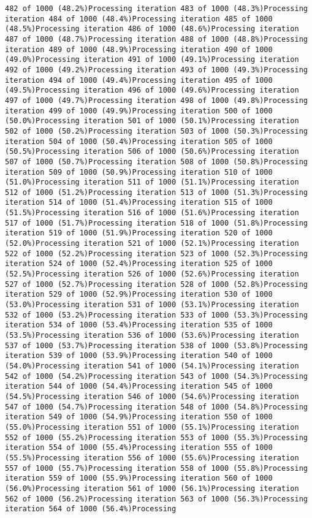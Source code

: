 \documentclass[
]{article}
\begin{document}
\begin{verbatim}
482 of 1000 (48.2%)Processing iteration 483 of 1000 (48.3%)Processing iteration 484 of 1000 (48.4%)Processing iteration 485 of 1000 (48.5%)Processing iteration 486 of 1000 (48.6%)Processing iteration 487 of 1000 (48.7%)Processing iteration 488 of 1000 (48.8%)Processing iteration 489 of 1000 (48.9%)Processing iteration 490 of 1000 (49.0%)Processing iteration 491 of 1000 (49.1%)Processing iteration 492 of 1000 (49.2%)Processing iteration 493 of 1000 (49.3%)Processing iteration 494 of 1000 (49.4%)Processing iteration 495 of 1000 (49.5%)Processing iteration 496 of 1000 (49.6%)Processing iteration 497 of 1000 (49.7%)Processing iteration 498 of 1000 (49.8%)Processing iteration 499 of 1000 (49.9%)Processing iteration 500 of 1000 (50.0%)Processing iteration 501 of 1000 (50.1%)Processing iteration 502 of 1000 (50.2%)Processing iteration 503 of 1000 (50.3%)Processing iteration 504 of 1000 (50.4%)Processing iteration 505 of 1000 (50.5%)Processing iteration 506 of 1000 (50.6%)Processing iteration 507 of 1000 (50.7%)Processing iteration 508 of 1000 (50.8%)Processing iteration 509 of 1000 (50.9%)Processing iteration 510 of 1000 (51.0%)Processing iteration 511 of 1000 (51.1%)Processing iteration 512 of 1000 (51.2%)Processing iteration 513 of 1000 (51.3%)Processing iteration 514 of 1000 (51.4%)Processing iteration 515 of 1000 (51.5%)Processing iteration 516 of 1000 (51.6%)Processing iteration 517 of 1000 (51.7%)Processing iteration 518 of 1000 (51.8%)Processing iteration 519 of 1000 (51.9%)Processing iteration 520 of 1000 (52.0%)Processing iteration 521 of 1000 (52.1%)Processing iteration 522 of 1000 (52.2%)Processing iteration 523 of 1000 (52.3%)Processing iteration 524 of 1000 (52.4%)Processing iteration 525 of 1000 (52.5%)Processing iteration 526 of 1000 (52.6%)Processing iteration 527 of 1000 (52.7%)Processing iteration 528 of 1000 (52.8%)Processing iteration 529 of 1000 (52.9%)Processing iteration 530 of 1000 (53.0%)Processing iteration 531 of 1000 (53.1%)Processing iteration 532 of 1000 (53.2%)Processing iteration 533 of 1000 (53.3%)Processing iteration 534 of 1000 (53.4%)Processing iteration 535 of 1000 (53.5%)Processing iteration 536 of 1000 (53.6%)Processing iteration 537 of 1000 (53.7%)Processing iteration 538 of 1000 (53.8%)Processing iteration 539 of 1000 (53.9%)Processing iteration 540 of 1000 (54.0%)Processing iteration 541 of 1000 (54.1%)Processing iteration 542 of 1000 (54.2%)Processing iteration 543 of 1000 (54.3%)Processing iteration 544 of 1000 (54.4%)Processing iteration 545 of 1000 (54.5%)Processing iteration 546 of 1000 (54.6%)Processing iteration 547 of 1000 (54.7%)Processing iteration 548 of 1000 (54.8%)Processing iteration 549 of 1000 (54.9%)Processing iteration 550 of 1000 (55.0%)Processing iteration 551 of 1000 (55.1%)Processing iteration 552 of 1000 (55.2%)Processing iteration 553 of 1000 (55.3%)Processing iteration 554 of 1000 (55.4%)Processing iteration 555 of 1000 (55.5%)Processing iteration 556 of 1000 (55.6%)Processing iteration 557 of 1000 (55.7%)Processing iteration 558 of 1000 (55.8%)Processing iteration 559 of 1000 (55.9%)Processing iteration 560 of 1000 (56.0%)Processing iteration 561 of 1000 (56.1%)Processing iteration 562 of 1000 (56.2%)Processing iteration 563 of 1000 (56.3%)Processing iteration 564 of 1000 (56.4%)Processing 
\end{verbatim}
\end{document}
